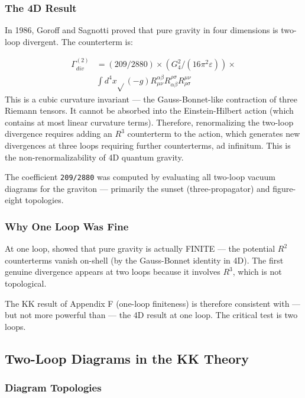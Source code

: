 \documentclass[aps,prd,preprint,superscriptaddress,longbibliography,floatfix]{revtex4-2}
\theoremstyle{remark}
\begin{document}
\subsubsection{The 4D Result}

In 1986, Goroff and Sagnotti proved that pure gravity in four dimensions is two-loop divergent. The counterterm is:


\begin{align}
    \Gamma^{(2)}_{div} &= (209/2880) \times (G_{4}^{2}/(16\pi^{2}\varepsilon)) \times \\
    & \int d^{4}x \sqrt{}(-g) R_{\mu\nu}^{\alpha\beta} R_{\alpha\beta}^{\rho\sigma} R_{\rho\sigma}^{\mu\nu}
\end{align}
This is a cubic curvature invariant --- the Gauss-Bonnet-like contraction of three Riemann tensors. It cannot be absorbed into the Einstein-Hilbert action (which contains at most linear curvature terms). Therefore, renormalizing the two-loop divergence requires adding an $R^{3}$ counterterm to the action, which generates new divergences at three loops requiring further counterterms, ad infinitum. This is the non-renormalizability of 4D quantum gravity.

The coefficient \texttt{209/2880} was computed by evaluating all two-loop vacuum diagrams for the graviton --- primarily the sunset (three-propagator) and figure-eight topologies.


\subsubsection{Why One Loop Was Fine}

At one loop, \cite{tHooftVeltman1974} showed that pure gravity is actually FINITE --- the potential $R^{2}$ counterterms vanish on-shell (by the Gauss-Bonnet identity in 4D). The first genuine divergence appears at two loops because it involves $R^{3}$, which is not topological.

The KK result of Appendix F (one-loop finiteness) is therefore consistent with --- but not more powerful than --- the 4D result at one loop. The critical test is two loops.



\subsection{Two-Loop Diagrams in the KK Theory}


\subsubsection{Diagram Topologies}
\end{document}
